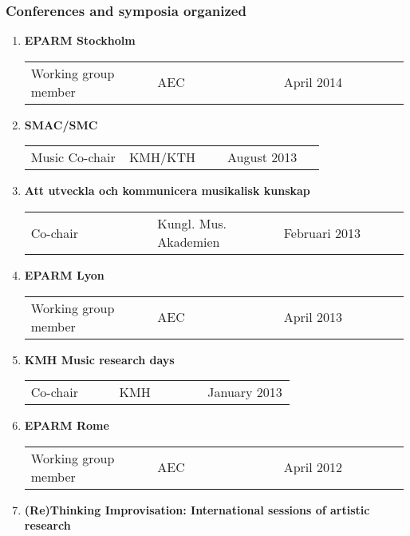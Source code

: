 \subsubsection*{\textsf{Conferences and symposia organized}}

\begin{enumerate}
\item \textbf{EPARM Stockholm}

  \begin{tabular}[l]{p{0.33\linewidth} p{0.33\linewidth} p{0.33\linewidth}}
    Working group member & AEC & April 2014    
  \end{tabular}

\item \textbf{SMAC/SMC}

  \begin{tabular}[c]{p{0.33\linewidth} p{0.33\linewidth} p{0.33\linewidth}}
    Music Co-chair & KMH/KTH & August 2013    
  \end{tabular}

\item \textbf{Att utveckla och kommunicera musikalisk kunskap }

  \begin{tabular}[c]{p{0.33\linewidth} p{0.33\linewidth} p{0.33\linewidth}}
    Co-chair & Kungl. Mus. Akademien & Februari 2013    
  \end{tabular}

\item \textbf{EPARM Lyon}

  \begin{tabular}[c]{p{0.33\linewidth} p{0.33\linewidth} p{0.33\linewidth}}
    Working group member & AEC & April 2013    
  \end{tabular}

\item \textbf{KMH Music research days}

  \begin{tabular}[c]{p{0.33\linewidth} p{0.33\linewidth} p{0.33\linewidth}}
    Co-chair & KMH & January 2013    
  \end{tabular}

\item \textbf{EPARM Rome}

  \begin{tabular}[c]{p{0.33\linewidth} p{0.33\linewidth} p{0.33\linewidth}}
    Working group member & AEC & April 2012    
  \end{tabular}

\item \textbf{(Re)Thinking Improvisation: International sessions of artistic research}


\end{enumerate}
